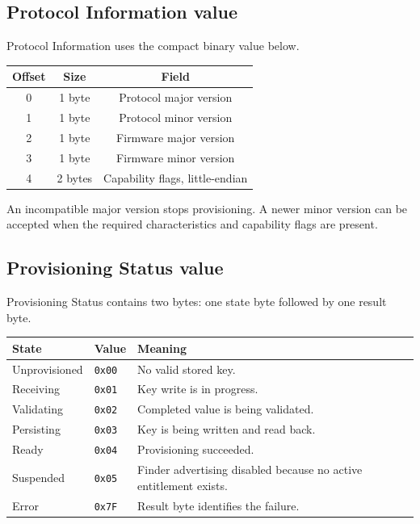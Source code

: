 \documentclass[12pt,a4paper]{article}
\newcommand{\code}[1]{\texttt{#1}}
\begin{document}
\subsection{Protocol Information value}

Protocol Information uses the compact binary value below.

\begin{table}[ht]
    \centering
    \begin{tabular}{ccc}
        \toprule
        \textbf{Offset} & \textbf{Size} & \textbf{Field} \\
        \midrule
        0 & 1 byte & Protocol major version \\
        1 & 1 byte & Protocol minor version \\
        2 & 1 byte & Firmware major version \\
        3 & 1 byte & Firmware minor version \\
        4 & 2 bytes & Capability flags, little-endian \\
        \bottomrule
    \end{tabular}
\end{table}

An incompatible major version stops provisioning. A newer minor version can be
accepted when the required characteristics and capability flags are present.

\subsection{Provisioning Status value}

Provisioning Status contains two bytes: one state byte followed by one result
byte.

\begin{table}[ht]
    \centering
    \begin{tabularx}{0.9\textwidth}{p{3.2cm}p{2.0cm}X}
        \toprule
        \textbf{State} & \textbf{Value} & \textbf{Meaning} \\
        \midrule
        Unprovisioned & \code{0x00} & No valid stored key. \\
        Receiving & \code{0x01} & Key write is in progress. \\
        Validating & \code{0x02} & Completed value is being validated. \\
        Persisting & \code{0x03} & Key is being written and read back. \\
        Ready & \code{0x04} & Provisioning succeeded. \\
        Suspended & \code{0x05} & Finder advertising disabled because no active entitlement exists. \\
        Error & \code{0x7F} & Result byte identifies the failure. \\
        \bottomrule
    \end{tabularx}
\end{table}
\end{document}
